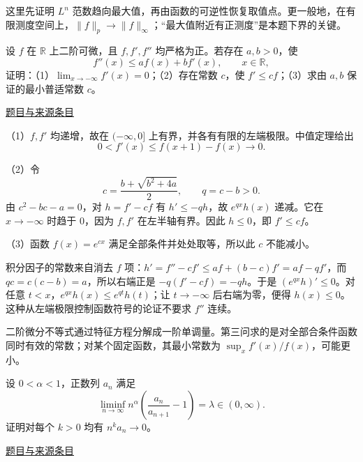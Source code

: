 \documentclass[12pt,fontset=fandol]{ctexart}
\begin{document}
\begin{remark}[方法与条件]这里先证明 $L^n$ 范数趋向最大值，再由函数的可逆性恢复取值点。更一般地，在有限测度空间上，$\|f\|_p\to\|f\|_\infty$；“最大值附近有正测度”是本题下界的关键。\end{remark}

\begin{example}[来源序号4]\label{ex:pre06-math:4}\label{pr:pre06-math:4}

设 $f$ 在 $\mathbb R$ 上二阶可微，且 $f,f',f''$ 均严格为正。若存在 $a,b>0$，使
\[
f''(x)\le af(x)+bf'(x),\qquad x\in\mathbb R,
\]
证明：（1）$\lim_{x\to-\infty}f'(x)=0$；（2）存在常数 $c$，使 $f'\le cf$；（3）求由 $a,b$ 保证的最小普适常数 $c$。

\par\href{https://github.com/lzxcr/cmc-mathematics/blob/64916fa1fdbc3e444a652eca204d5669058ee321/src/problems/preliminary/06/04.md}{题目与来源条目}

\end{example}

\begin{solve}\label{ans:pre06-math:4}

（1）$f,f'$ 均递增，故在 $(-\infty,0]$ 上有界，并各有有限的左端极限。中值定理给出
\[
0<f'(x)\le f(x+1)-f(x)\longrightarrow0.
\]

（2）令
\[
c=\frac{b+\sqrt{b^2+4a}}2,\qquad q=c-b>0.
\]
由 $c^2-bc-a=0$，对 $h=f'-cf$ 有 $h'\le-qh$，故 $e^{qx}h(x)$ 递减。它在 $x\to-\infty$ 时趋于 $0$，因为 $f,f'$ 在左半轴有界。因此 $h\le0$，即 $f'\le cf$。

（3）函数 $f(x)=e^{cx}$ 满足全部条件并处处取等，所以此 $c$ 不能减小。

积分因子的常数来自消去 $f$ 项：$h'=f''-cf'\le af+(b-c)f'=af-qf'$，而 $qc=c(c-b)=a$，所以右端正是 $-q(f'-cf)=-qh$。于是 $(e^{qx}h)'\le0$。对任意 $t<x$，$e^{qx}h(x)\le e^{qt}h(t)$；让 $t\to-\infty$ 后右端为零，便得 $h(x)\le0$。这种从左端极限控制函数符号的论证不要求 $f''$ 连续。

\end{solve}

\begin{remark}[方法与条件]二阶微分不等式通过特征方程分解成一阶单调量。第三问求的是对全部合条件函数同时有效的常数；对某个固定函数，其最小常数为 $\sup_x f'(x)/f(x)$，可能更小。\end{remark}

\begin{example}[来源序号6]\label{ex:pre06-math:6}\label{pr:pre06-math:6}

设 $0<\alpha<1$，正数列 $a_n$ 满足
\[
\liminf_{n\to\infty}n^\alpha\left(\frac{a_n}{a_{n+1}}-1\right)
=\lambda\in(0,\infty).
\]
证明对每个 $k>0$ 均有 $n^ka_n\to0$。

\par\href{https://github.com/lzxcr/cmc-mathematics/blob/64916fa1fdbc3e444a652eca204d5669058ee321/src/problems/preliminary/06/06.md}{题目与来源条目}

\end{example}
\end{document}
